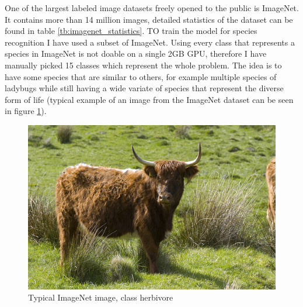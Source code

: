 \documentclass[times, utf8, diplomski]{fer}
\begin{document}
One of the largest labeled image datasets freely opened to the public is ImageNet. It contains more than 14 million images, detailed statistics of the dataset can be found in table \ref{tb:imagenet_statistics}. TO train the model for species recognition I have used a subset of ImageNet. Using every class that represents a species in ImageNet is not doable on a single 2GB GPU, therefore I have manually picked 15 classes which represent the whole problem. The idea is to have some species that are similar to others, for example multiple species of ladybugs while still having a wide variate of species that represent the diverse form of life (typical example of an image from the ImageNet dataset can be seen in figure \ref{fig:typical_imagenet_example}).

\begin{figure}
  \includegraphics[scale=0.55]{figures/typical_imagenet.jpg}
  \centering
  \caption{Typical ImageNet image, class herbivore}
  \label{fig:typical_imagenet_example}
\end{figure}
\end{document}
